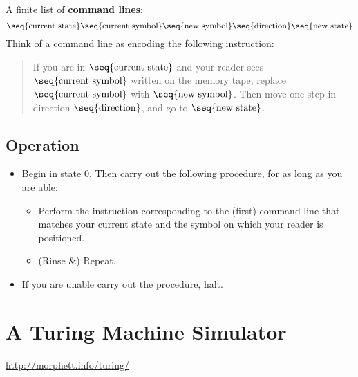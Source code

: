 \documentclass[12pt]{extarticle}
\begin{document}
A  finite list of \textbf{command lines}:
\[
\seq{\text{current state}} \seq{\text{current symbol}} \seq{\text{new symbol}} \seq{\text{direction}} \seq{\text{new state}}
\]
Think of a command line as encoding the following instruction:

\begin{quote}If you are in $\seq{\text{current state}}$ and your reader sees $\seq{\text{current symbol}}$ written on the memory tape, replace $\seq{\text{current symbol}}$ with $\seq{\text{new symbol}}$. Then move one step in direction $\seq{\text{direction}}$, and go to $\seq{\text{new state}}$.
\end{quote}

\subsection*{Operation}

\begin{itemize}

\item Begin in state 0. Then carry out the following procedure, for as long as you are able:

\begin{itemize}

\item Perform the instruction corresponding to the (first) command line that matches your current state and the symbol on which your reader is positioned.  


\item (Rinse \&) Repeat. 

\end{itemize}


\item If you are unable carry out the procedure, halt.


\end{itemize}

\section{A Turing Machine Simulator}

\url{http://morphett.info/turing/}



\end{document}
